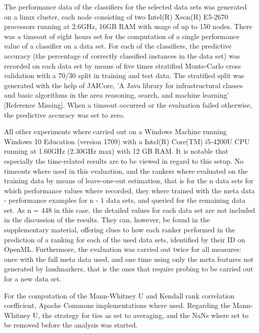 
The performance data of the classifiers for the selected data sets was generated on a linux cluster, each node consisting of two Intel(R) Xeon(R) E5-2670 processors running at 2.6GHz, 16GB RAM with usage of up to 150 nodes. There was a timeout of eight hours set for the computation of a single performance value of a classifier on a data set. For each of the classifiers, the predictive accuracy (the percentage of correctly classified instances in the data set) was recorded on each data set by means of five times stratified Monte-Carlo cross validation with a 70/30 split in training and test data. The stratified split was generated with the help of JAICore, 'A Java library for infrastructural classes and basic algorithms in the area reasoning, search, and machine learning' [Reference Missing]. When a timeout occurred or the evaluation failed otherwise, the predictive accuracy was set to zero.

All other experiments where carried out on a Windows Machine running Windows 10 Education (version 1709) with a Intel(R) Core(TM) i5-4200U CPU running at 1.60GHz (2.30GHz max) with 12 GB RAM. It is notable that especially the time-related results are to be viewed in regard to this setup. No timeouts where used in this evaluation, and the rankers where evaluated on the training data by means of leave-one-out estimation, that is for the n data sets for which performance values where recorded, they where trained with the meta data - performance examples for n - 1 data sets, and queried for the remaining data set. As n = 448 in this case, the detailed values for each data set are not included in the discussion of the results. They can, however, be found in the supplementary material, offering clues to how each ranker performed in the prediction of a ranking for each of the used data sets, identified by their ID on OpenML. Furthermore, the evaluation was carried out twice for all measures: once with the full meta data used, and one time using only the meta features not generated by landmarkers, that is the ones that require probing to be carried out for a new data set.

For the computation of the Mann-Whitney U and Kendall rank correlation coefficient, Apache Commons implementations where used. Regarding the Mann-Whitney U, the strategy for ties as set to averaging, and the NaNs where set to be removed before the analysis was started.

